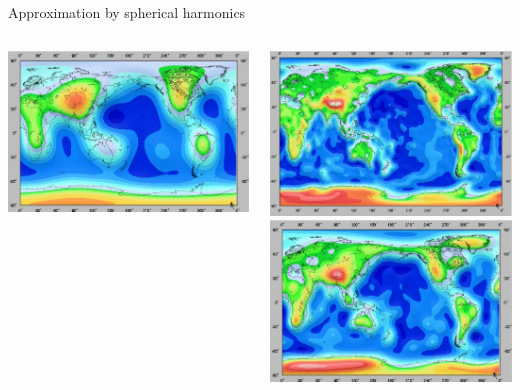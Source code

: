 \begin{frame}{Approximation by spherical harmonics}
	\begin{columns}[T]
	\centering
	\includegraphics[width=\textwidth]{earth_to6}\\
	
	\includegraphics[width=\textwidth]{earth_to36}\\
	\includegraphics[width=\textwidth]{earth_to16}\\
	

\end{columns}
\end{frame}

